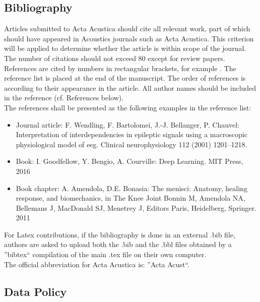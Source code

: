 \subsection{Bibliography }

Articles submitted to Acta Acustica should cite all relevant work,
part of which should have appeared in Acoustics journals such as Acta
Acustica. This criterion will be applied to determine whether the
article is within scope of the journal.\\

The number of citations should not exceed 80 except for review papers.
References are cited by numbers in rectangular brackets, for example
\cite{key-1,key-2}. The reference list is placed at the end of the
manuscript. The order of references is according to their appearance
in the article. All author names should be included in the reference
(cf. References below).\\

The references shall be presented as the following examples in the
reference list:
\begin{itemize}
\item Journal article: F. Wendling, F. Bartolomei, J.-J. Bellanger, P. Chauvel:
Interpretation of interdependencies in epileptic signals using a macroscopic
physiological model of eeg. Clinical neurophysiology 112 (2001) 1201--1218. 
\item Book: I. Goodfellow, Y. Bengio, A. Courville: Deep Learning. MIT Press,
2016 
\item Book chapter: A. Amendola, D.E. Bonasia: The menisci: Anatomy, healing
response, and biomechanics, in The Knee Joint Bonnin M, Amendola NA,
Bellemans J, MacDonald SJ, Menetrey J, Editors Paris, Heidelberg,
Springer. 2011 
\end{itemize}

\cite{gibiat_phase_1988}
For Latex contributions, if the bibliography is done in an external
.bib file, authors are asked to upload both the .bib and the .bbl
files obtained by a \textquotedblright bibtex\textquotedblleft{} compilation
of the main .tex file on their own computer.\\

The official abbreviation for Acta Acustica is: \textquotedblright Acta
Acust\textquotedblleft .

\subsection{Data Policy }

